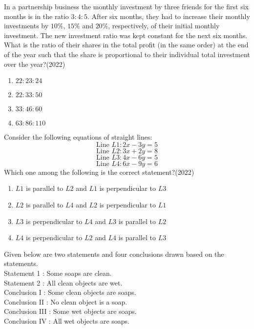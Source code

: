 \item In a partnership business the monthly investment by three friends for the first
six months is in the ratio $3:4:5$. After six months, they had to increase their
monthly investments by $10\%$, $15\%$ and $20\%$, respectively, of their initial
monthly investment. The new investment ratio was kept constant for the next
six months.\\

What is the ratio of their shares in the total profit (in the same order) at the end
of the year such that the share is proportional to their individual total investment
over the year?\hfill(2022)
\begin{multicols}{2}
\begin{enumerate}
\item $22:23:24$
\item $22:33:50$
\item $33:46:60$
\item $63:86:110$
\end{enumerate}
\end{multicols}


\item Consider the following equations of straight lines:
$$\text{Line }L1:2x-3y=5$$
$$\text{Line }L2:3x+2y=8$$
$$\text{Line }L3:4x-6y=5$$
$$\text{Line }L4:6x-9y=6$$
Which one among the following is the correct statement?\hfill(2022)
\begin{enumerate}
\item $L1$ is parallel to $L2$ and $L1$ is perpendicular to $L3$
\item $L2$ is parallel to $L4$ and $L2$ is perpendicular to $L1$
\item $L3$ is perpendicular to $L4$ and $L3$ is parallel to $L2$
\item $L4$ is perpendicular to $L2$ and $L4$ is parallel to $L3$
\end{enumerate}


\item Given below are two statements and four conclusions drawn based on the
statements.\\

Statement 1 : Some soaps are clean.\\
Statement 2 :  All clean objects are wet.\\

Conclusion \textsc{I} : Some clean objects are soaps.\\
Conclusion \textsc{II} : No clean object is a soap.\\
Conclusion \textsc{III} :  Some wet objects are soaps.\\
Conclusion \textsc{IV} : All wet objects are soaps.\\

